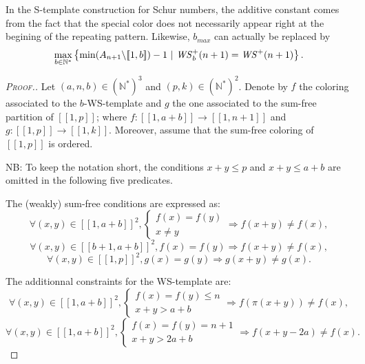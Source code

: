 \begin{remark}
In the S-template construction for Schur numbers, the additive constant comes from the fact that the special color does
not necessarily appear right at the begining of the repeating pattern. Likewise, \(b_{max}\) can actually be replaced by
\[
\max_{b \in \mathbb{N}^*} \left\{\min (A_{n+1} \backslash [\![1, b ]\!]) - 1~|~ \mathit{WS}_b^+(n+1) = \mathit{WS}^+(n+1) \right\}.
\]
\end{remark}

\begin{proof}[\textsc{Proof.}]
\begin{sloppypar}
Let \((a,n,b) \in (\mathbb{N}^*)^3\) and \((p,k) \in (\mathbb{N}^*)^2\). Denote by \(f\) the coloring
associated to the \(b\)-WS-template  and \(g\) the one associated to the sum-free partition of \([\![1,p]\!]\); where
\({f : [\![1, a + b]\!] \longrightarrow [\![1,n+1]\!]}\) and \({g : [\![1, p]\!]  \longrightarrow [\![1, k]\!]}\). Moreover, assume
that the sum-free coloring of \([\![1, p]\!]\) is ordered.
\end{sloppypar}

\par
NB: To keep the notation short, the conditions \(x + y \leqslant p\)  and \(x + y \leqslant a + b\) are omitted in the following five predicates.
\par
The (weakly) sum-free conditions are expressed as:
\begin{equation}
\forall (x,y) \in [\![1,a + b]\!]^2, \left\{
\begin{array}{l}
	f(x) = f(y) \\
	x \neq y
\end{array}
\right. \Longrightarrow f(x+y) \neq f(x),
\end{equation}
\begin{equation}
\forall (x,y) \in [\![b+1,a + b]\!]^2, f(x) = f(y) \Longrightarrow f(x+y) \neq f(x),
\end{equation}
\begin{equation}
\forall (x,y) \in [\![1,p]\!]^2, g(x) = g(y) \Longrightarrow g(x+y) \neq g(x).
\end{equation}

The additionnal constraints for the WS-template are:
\begin{equation}
\forall (x,y) \in [\![1,a + b]\!]^2, \left\{
\begin{array}{l}
	f(x) = f(y) \leqslant n \\
	x + y > a + b
\end{array}
\right. \Longrightarrow f(\pi(x+y)) \neq f(x),
\end{equation}
\begin{equation}
\forall (x,y) \in [\![1,a + b]\!]^2, \left\{
\begin{array}{l}
	f(x) = f(y) = n + 1 \\
	x + y > 2 a + b
\end{array}
\right. \Longrightarrow f(x+y - 2 a) \neq f(x).
\end{equation}


\end{proof}
